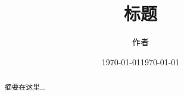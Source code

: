\documentclass{article}
\title{标题}
\author{作者}
\date{\today}
\date{\today} %
\begin{document}
\maketitle

\begin{abstract}
摘要在这里...
\end{abstract}
\end{document}
